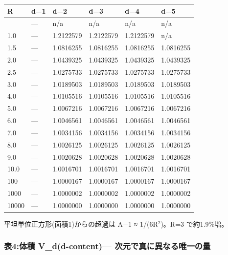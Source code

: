 \documentclass[
]{ltjsarticle}
\newcounter{none} %
\begin{document}
{\def\LTcaptype{none} %
\begin{longtable}[]{@{}llllll@{}}
\toprule\noalign{}
R & d=1 & d=2 & d=3 & d=4 & d=5 \\
\midrule\noalign{}
\endhead
\bottomrule\noalign{}
\endlastfoot
0.5 & --- & n/a & n/a & n/a & n/a \\
1.0 & --- & 1.2122579 & 1.2122579 & 1.2122579 & n/a \\
1.5 & --- & 1.0816255 & 1.0816255 & 1.0816255 & 1.0816255 \\
2.0 & --- & 1.0439325 & 1.0439325 & 1.0439325 & 1.0439325 \\
2.5 & --- & 1.0275733 & 1.0275733 & 1.0275733 & 1.0275733 \\
3.0 & --- & 1.0189503 & 1.0189503 & 1.0189503 & 1.0189503 \\
4.0 & --- & 1.0105516 & 1.0105516 & 1.0105516 & 1.0105516 \\
5.0 & --- & 1.0067216 & 1.0067216 & 1.0067216 & 1.0067216 \\
6.0 & --- & 1.0046561 & 1.0046561 & 1.0046561 & 1.0046561 \\
7.0 & --- & 1.0034156 & 1.0034156 & 1.0034156 & 1.0034156 \\
8.0 & --- & 1.0026125 & 1.0026125 & 1.0026125 & 1.0026125 \\
9.0 & --- & 1.0020628 & 1.0020628 & 1.0020628 & 1.0020628 \\
10.0 & --- & 1.0016701 & 1.0016701 & 1.0016701 & 1.0016701 \\
100 & --- & 1.0000167 & 1.0000167 & 1.0000167 & 1.0000167 \\
1000 & --- & 1.0000002 & 1.0000002 & 1.0000002 & 1.0000002 \\
10000 & --- & 1.0000000 & 1.0000000 & 1.0000000 & 1.0000000 \\
\end{longtable}
}

平坦単位正方形(面積1)からの超過は A−1 ≈ 1/(6R\(^{2}\))。R=3
で約1.9\%増。

\subsubsection{表4:体積 V\_d(d-content)---
次元で真に異なる唯一の量}\label{ux88684ux4f53ux7a4d-v_dd-content-ux6b21ux5143ux3067ux771fux306bux7570ux306aux308bux552fux4e00ux306eux91cf}
\end{document}

